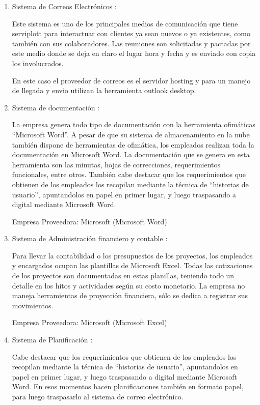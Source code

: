 	\begin{enumerate}[1)]
	\item Sistema de Correos Electrónicos :
	
	
	 Este sistema es uno de los principales medios de comunicación que tiene serviplott para interactuar con clientes ya sean nuevos o ya existentes, como también con sus colaboradores.  Las reuniones son solicitadas y pactadas por este medio donde se deja en claro el lugar hora y fecha y es enviado con copia los involucrados.   
	

En este caso el proveedor de correos es el servidor hosting y para un manejo de llegada y envio utilizan la herramienta outlook desktop.  

	\item Sistema de documentación :
	
	
	 La empresa genera todo tipo de documentación con la herramienta ofimáticas “Microsoft Word”. A pesar de que su sistema de almacenamiento en la nube también dispone de herramientas de ofimática, los empleados realizan toda la documentación en Microsoft Word.
La documentación que se genera en esta herramienta son las minutas, hojas de correcciones, requerimientos funcionales, entre otros. También cabe destacar que los requerimientos que obtienen de los empleados los recopilan mediante la técnica de “historias de usuario”, apuntandolos en papel en primer lugar, y luego traspasando a digital mediante Microsoft Word. 



Empresa Proveedora: Microsoft (Microsoft Word)


	\item Sistema de Administración  financiero y contable :

Para llevar la contabilidad o los presupuestos de los proyectos, los empleados y encargados ocupan las plantillas de Microsoft Excel. Todas las cotizaciones de los proyectos son documentadas en estas planillas, teniendo todo un detalle en los hitos y actividades según su costo monetario. La empresa no maneja herramientas de proyección financiera, sólo se dedica a registrar sus movimientos.


Empresa Proveedora: Microsoft (Microsoft Excel)

	\item Sistema de Planificación :


Cabe destacar que los requerimientos que obtienen de los empleados los recopilan mediante la técnica de “historias de usuario”, apuntandolos en papel en primer lugar, y luego traspasando a digital mediante Microsoft Word. En esos momentos hacen planificaciones también en formato papel, para luego traspasarlo al sistema de correo electrónico.



\end{enumerate}
